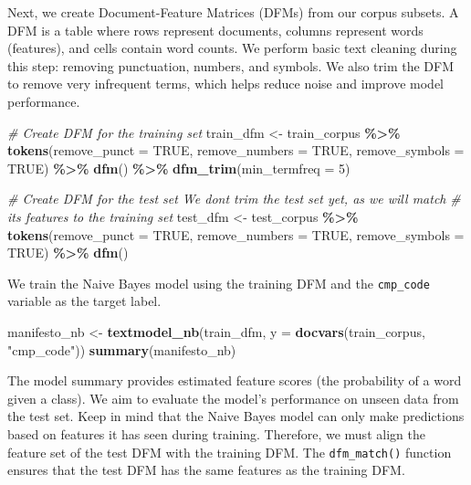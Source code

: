 \documentclass[
]{book}
\newenvironment{Shaded}{\begin{snugshade}}{\end{snugshade}}
\newcommand{\AttributeTok}[1]{\textcolor[rgb]{0.13,0.29,0.53}{#1}}
\newcommand{\CommentTok}[1]{\textcolor[rgb]{0.56,0.35,0.01}{\textit{#1}}}
\newcommand{\ConstantTok}[1]{\textcolor[rgb]{0.56,0.35,0.01}{#1}}
\newcommand{\DecValTok}[1]{\textcolor[rgb]{0.00,0.00,0.81}{#1}}
\newcommand{\FunctionTok}[1]{\textcolor[rgb]{0.13,0.29,0.53}{\textbf{#1}}}
\newcommand{\NormalTok}[1]{#1}
\newcommand{\OtherTok}[1]{\textcolor[rgb]{0.56,0.35,0.01}{#1}}
\newcommand{\SpecialCharTok}[1]{\textcolor[rgb]{0.81,0.36,0.00}{\textbf{#1}}}
\newcommand{\StringTok}[1]{\textcolor[rgb]{0.31,0.60,0.02}{#1}}
\begin{document}
Next, we create Document-Feature Matrices (DFMs) from our corpus subsets. A DFM is a table where rows represent documents, columns represent words (features), and cells contain word counts. We perform basic text cleaning during this step: removing punctuation, numbers, and symbols. We also trim the DFM to remove very infrequent terms, which helps reduce noise and improve model performance.

\begin{Shaded}
\begin{Highlighting}[]
\CommentTok{\# Create DFM for the training set}
\NormalTok{train\_dfm }\OtherTok{\textless{}{-}}\NormalTok{ train\_corpus }\SpecialCharTok{\%\textgreater{}\%}
    \FunctionTok{tokens}\NormalTok{(}\AttributeTok{remove\_punct =} \ConstantTok{TRUE}\NormalTok{, }\AttributeTok{remove\_numbers =} \ConstantTok{TRUE}\NormalTok{, }\AttributeTok{remove\_symbols =} \ConstantTok{TRUE}\NormalTok{) }\SpecialCharTok{\%\textgreater{}\%}
    \FunctionTok{dfm}\NormalTok{() }\SpecialCharTok{\%\textgreater{}\%}
    \FunctionTok{dfm\_trim}\NormalTok{(}\AttributeTok{min\_termfreq =} \DecValTok{5}\NormalTok{)}

\CommentTok{\# Create DFM for the test set We don\textquotesingle{}t trim the test set yet, as we will match}
\CommentTok{\# its features to the training set}
\NormalTok{test\_dfm }\OtherTok{\textless{}{-}}\NormalTok{ test\_corpus }\SpecialCharTok{\%\textgreater{}\%}
    \FunctionTok{tokens}\NormalTok{(}\AttributeTok{remove\_punct =} \ConstantTok{TRUE}\NormalTok{, }\AttributeTok{remove\_numbers =} \ConstantTok{TRUE}\NormalTok{, }\AttributeTok{remove\_symbols =} \ConstantTok{TRUE}\NormalTok{) }\SpecialCharTok{\%\textgreater{}\%}
    \FunctionTok{dfm}\NormalTok{()}
\end{Highlighting}
\end{Shaded}

We train the Naive Bayes model using the training DFM and the \texttt{cmp\_code} variable as the target label.

\begin{Shaded}
\begin{Highlighting}[]
\NormalTok{manifesto\_nb }\OtherTok{\textless{}{-}} \FunctionTok{textmodel\_nb}\NormalTok{(train\_dfm, }\AttributeTok{y =} \FunctionTok{docvars}\NormalTok{(train\_corpus, }\StringTok{"cmp\_code"}\NormalTok{))}
\FunctionTok{summary}\NormalTok{(manifesto\_nb)}
\end{Highlighting}
\end{Shaded}

The model summary provides estimated feature scores (the probability of a word given a class). We aim to evaluate the model's performance on unseen data from the test set. Keep in mind that the Naive Bayes model can only make predictions based on features it has seen during training. Therefore, we must align the feature set of the test DFM with the training DFM. The \texttt{dfm\_match()} function ensures that the test DFM has the same features as the training DFM.
\end{document}
